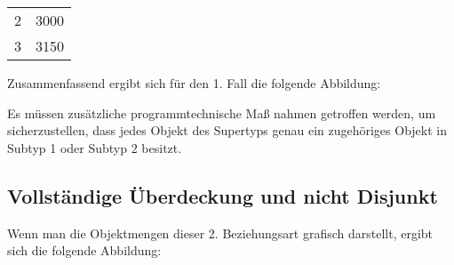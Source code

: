 
          \begin{supertabular}[h]{lp{5cm}}
            2 & 3000\\
            3 & 3150\\
          \end{supertabular}

          Zusammenfassend ergibt sich für den 1. Fall die folgende Abbildung:

          \begin{center}
          \end{center}
\vspace{\baselineskip}
          \begin{center}
          \end{center}

          \begin{merke}
            Es müssen zusätzliche programmtechnische Maß nahmen getroffen werden, um sicherzustellen, dass jedes Objekt des Supertyps genau ein zugehöriges Objekt in Subtyp 1 oder Subtyp 2 besitzt.
          \end{merke}
      \subsection{Vollständige Überdeckung und nicht Disjunkt}
        Wenn man die Objektmengen dieser 2. Beziehungsart grafisch darstellt, ergibt sich die folgende Abbildung:

